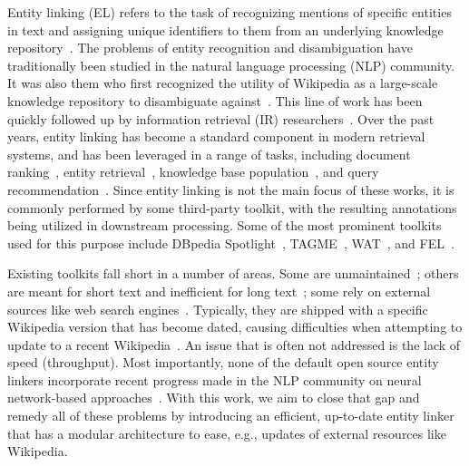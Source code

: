 \documentclass[sigconf]{acmart}
\begin{document}
Entity linking (EL) refers to the task of recognizing mentions of specific entities in text and assigning unique identifiers to them from an underlying knowledge repository~\citep{Balog:2018:EOS}.  The problems of entity recognition and disambiguation have traditionally been studied in the natural language processing (NLP) community.  It was also them who first recognized the utility of Wikipedia as a large-scale knowledge repository to disambiguate against~\citep{Bunescu:2006:UEK,Cucerzan:2007:LSN}.
This line of work has been quickly followed up by information retrieval (IR) researchers~\citep{Milne:2008:LLW,Mihalcea:2007:WLD}.
Over the past years, entity linking has become a standard component in modern retrieval systems, and has been leveraged in a range of tasks, including document ranking~\citep{Xiong:2017:WDR}, entity retrieval~\citep{Hasibi:2016:EEL}, knowledge base population~\citep{Balog:2013:MCA}, and query recommendation~\citep{Reinanda:2015:MRR}.  Since entity linking is not the main focus of these works, it is commonly performed by some third-party toolkit, with the resulting annotations being utilized in downstream processing.  
Some of the most prominent toolkits used for this purpose include DBpedia Spotlight~\citep{Mendes:2011:DSS}, TAGME~\citep{Ferragina:2010:TOA}, WAT~\cite{Piccinno:2014:WAT}, and FEL~\cite{Pappu:2017:LME}.



Existing toolkits fall short in a number of areas.  Some are unmaintained~\cite{Pappu:2017:LME}; others are meant for short text and inefficient for long text~\cite{Hasibi:2017:NTE}; some rely on external sources like web search engines~\cite{Cornolti:2018:APA}. Typically, they are shipped with a specific Wikipedia version that has become dated, causing difficulties when attempting to update to a recent Wikipedia~\cite{Piccinno:2014:WAT, Cornolti:2018:APA}. An issue that is often not addressed is the lack of speed (throughput). Most importantly, none of the default open source entity linkers incorporate recent progress made in the NLP community on neural network-based approaches~\cite{Kolitsas:2018:ENE}. With this work, we aim to close that gap and remedy all of these problems by introducing an efficient, up-to-date entity linker that has a modular architecture to ease, e.g., updates of external resources like Wikipedia.
\end{document}
